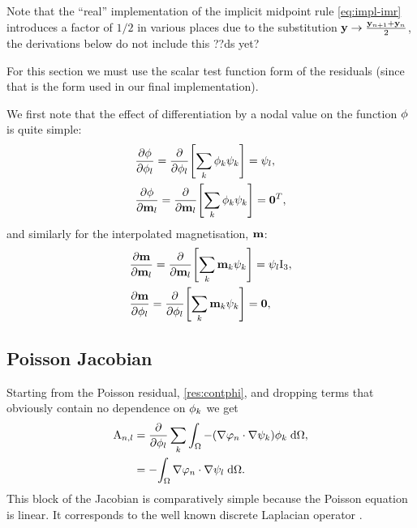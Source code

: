 Note that the ``real'' implementation of the implicit midpoint rule \cref{eq:impl-imr} introduces a factor of $1/2$ in various places due to the substitution $ \mathbf{y} \rightarrow \frac{\mathbf{y}_{n+1} + \mathbf{y}_n}{2}$, the derivations below do not include this ??ds yet?

For this section we must use the scalar test function form of the residuals (since that is the form used in our final implementation).

We first note that the effect of differentiation by a nodal value on the function $\phi$ is quite simple:
\begin{equation}
  \begin{aligned}
    &\frac{\partial \phi}{\partial \phi_l} = \frac{\partial }{\partial \phi_l} {\left[  \sum_k \phi_k {\psi_k}  \right]} = \psi_l, \\
    &\frac{\partial \phi}{\partial \mathbf{m}_l} = \frac{\partial }{\partial \mathbf{m}_l} {\left[  \sum_k \phi_k {\psi_k}  \right]} = \mathbf{0}^T, \\
  \end{aligned}
\end{equation}
and similarly for the interpolated magnetisation, $\mathbf{m}$:
\begin{equation}
  \begin{aligned}
    &\frac{\partial \mathbf{m}}{\partial \mathbf{m}_l} = \frac{\partial }{\partial \mathbf{m}_l} {\left[  \sum_k \mathbf{m}_k {\psi_k}  \right]} = \psi_l \text{I}_3, \\
    &\frac{\partial \mathbf{m}}{\partial \phi_l} = \frac{\partial }{\partial \phi_l} {\left[  \sum_k \mathbf{m}_k {\psi_k}  \right]} = \mathbf{0}, \\
\end{aligned} 
\end{equation}

\subsection{Poisson Jacobian}
\label{sec:poisson-jacobian}

Starting from the Poisson residual, \cref{res:contphi}, and dropping terms that obviously contain no dependence on $\phi_k$ we get
\begin{equation}
  \begin{aligned}
    \label{eq:poisson-jacobian}
    \mathrm{A}_{n,l} &= \frac{\partial }{\partial \phi_{l}} \sum_k {\int_{\Omega}  -(\nabla \varphi_n \cdot \nabla \psi_k) \phi_{k} {\; \text{d}} {\Omega}}, \\
    &= -{\int_{\Omega} \nabla \varphi_n \cdot \nabla \psi_l {\; \text{d}} {\Omega}}.
  \end{aligned}
\end{equation}
This block of the Jacobian is comparatively simple because the Poisson equation is linear. 
It corresponds to the well known discrete Laplacian operator \cite{HowardElmanDavidSilvester2006}.


